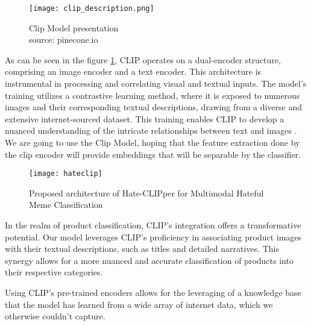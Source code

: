 \begin{figure}[H]
    \centering
    \texttt{[image: clip\_description.png]}
    \caption{Clip Model presentation \\ source: pinecone.io}
    \label{fig:clip-architecture}
\end{figure}


As can be seen in the figure \ref{fig:clip-architecture}, CLIP operates on a dual-encoder structure, comprising an image encoder and a text encoder. This architecture is instrumental in processing and correlating visual and textual inputs. The model's training utilizes a contrastive learning method, where it is exposed to numerous images and their corresponding textual descriptions, drawing from a diverse and extensive internet-sourced dataset. This training enables CLIP to develop a nuanced understanding of the intricate relationships between text and images \cite{radford-2021}.
We are going to use the Clip Model, hoping that the feature extraction done by the clip encoder will provide embeddings that will be separable by the classifier.

\begin{figure}[H]
    \centering
    \texttt{[image: hateclip]}
    \caption{Proposed architecture of Hate-CLIPper for Multimodal Hateful Meme Classification \cite{radford-2021}}
    \label{fig:architecture}
\end{figure}

In the realm of product classification, CLIP's integration offers a transformative potential. Our model leverages CLIP's proficiency in associating product images with their textual descriptions, such as titles and detailed narratives. This synergy allows for a more nuanced and accurate classification of products into their respective categories.

Using CLIP's pre-trained encoders allows for the leveraging of a knowledge base that the model has learned from a wide array of internet data, which we otherwise couldn't capture.

